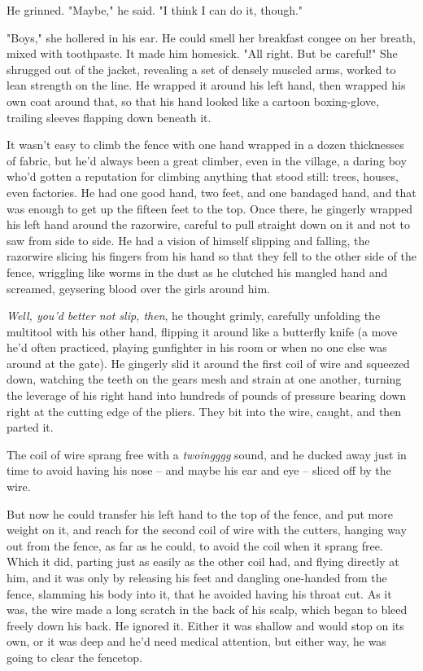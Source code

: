 He grinned. "Maybe," he said. "I think I can do it, though."

"Boys," she hollered in his ear. He could smell her breakfast
congee on her breath, mixed with toothpaste. It made him homesick.
"All right. But be careful!" She shrugged out of the jacket,
revealing a set of densely muscled arms, worked to lean strength on
the line. He wrapped it around his left hand, then wrapped his own
coat around that, so that his hand looked like a cartoon
boxing-glove, trailing sleeves flapping down beneath it.

It wasn't easy to climb the fence with one hand wrapped in a dozen
thicknesses of fabric, but he'd always been a great climber, even
in the village, a daring boy who'd gotten a reputation for climbing
anything that stood still: trees, houses, even factories. He had
one good hand, two feet, and one bandaged hand, and that was enough
to get up the fifteen feet to the top. Once there, he gingerly
wrapped his left hand around the razorwire, careful to pull
straight down on it and not to saw from side to side. He had a
vision of himself slipping and falling, the razorwire slicing his
fingers from his hand so that they fell to the other side of the
fence, wriggling like worms in the dust as he clutched his mangled
hand and screamed, geysering blood over the girls around him.

\emph{Well, you'd better not slip, then}, he thought grimly,
carefully unfolding the multitool with his other hand, flipping it
around like a butterfly knife (a move he'd often practiced, playing
gunfighter in his room or when no one else was around at the gate).
He gingerly slid it around the first coil of wire and squeezed
down, watching the teeth on the gears mesh and strain at one
another, turning the leverage of his right hand into hundreds of
pounds of pressure bearing down right at the cutting edge of the
pliers. They bit into the wire, caught, and then parted it.

The coil of wire sprang free with a \emph{twoingggg} sound, and he
ducked away just in time to avoid having his nose -- and maybe his
ear and eye -- sliced off by the wire.

But now he could transfer his left hand to the top of the fence,
and put more weight on it, and reach for the second coil of wire
with the cutters, hanging way out from the fence, as far as he
could, to avoid the coil when it sprang free. Which it did, parting
just as easily as the other coil had, and flying directly at him,
and it was only by releasing his feet and dangling one-handed from
the fence, slamming his body into it, that he avoided having his
throat cut. As it was, the wire made a long scratch in the back of
his scalp, which began to bleed freely down his back. He ignored
it. Either it was shallow and would stop on its own, or it was deep
and he'd need medical attention, but either way, he was going to
clear the fencetop.

